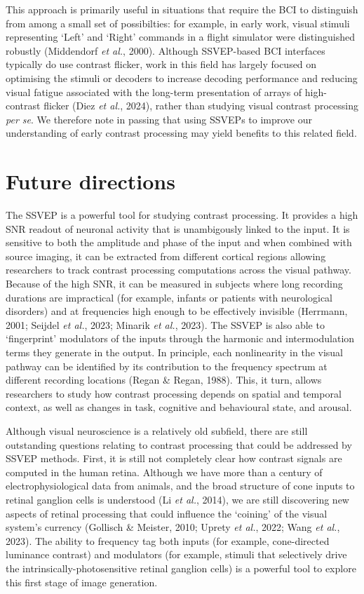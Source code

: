 \documentclass[
  letterpaper,
  DIV=11,
  numbers=noendperiod]{scrartcl}
\begin{document}
This approach is primarily useful in situations that require the BCI to
distinguish from among a small set of possibilties: for example, in
early work, visual stimuli representing `Left' and `Right' commands in a
flight simulator were distinguished robustly (Middendorf \emph{et al.},
2000). Although SSVEP-based BCI interfaces typically do use contrast
flicker, work in this field has largely focused on optimising the
stimuli or decoders to increase decoding performance and reducing visual
fatigue associated with the long-term presentation of arrays of
high-contrast flicker (Diez \emph{et al.}, 2024), rather than studying
visual contrast processing \textit{per se}. We therefore note in passing
that using SSVEPs to improve our understanding of early contrast
processing may yield benefits to this related field.

\section{Future directions}\label{future-directions}

The SSVEP is a powerful tool for studying contrast processing. It
provides a high SNR readout of neuronal activity that is unambigously
linked to the input. It is sensitive to both the amplitude and phase of
the input and when combined with source imaging, it can be extracted
from different cortical regions allowing researchers to track contrast
processing computations across the visual pathway. Because of the high
SNR, it can be measured in subjects where long recording durations are
impractical (for example, infants or patients with neurological
disorders) and at frequencies high enough to be effectively invisible
(Herrmann, 2001; Seijdel \emph{et al.}, 2023; Minarik \emph{et al.},
2023). The SSVEP is also able to `fingerprint' modulators of the inputs
through the harmonic and intermodulation terms they generate in the
output. In principle, each nonlinearity in the visual pathway can be
identified by its contribution to the frequency spectrum at different
recording locations (Regan \& Regan, 1988). This, it turn, allows
researchers to study how contrast processing depends on spatial and
temporal context, as well as changes in task, cognitive and behavioural
state, and arousal.

Although visual neuroscience is a relatively old subfield, there are
still outstanding questions relating to contrast processing that could
be addressed by SSVEP methods. First, it is still not completely clear
how contrast signals are computed in the human retina. Although we have
more than a century of electrophysiological data from animals, and the
broad structure of cone inputs to retinal ganglion cells is understood
(Li \emph{et al.}, 2014), we are still discovering new aspects of
retinal processing that could influence the `coining' of the visual
system's currency (Gollisch \& Meister, 2010; Uprety \emph{et al.},
2022; Wang \emph{et al.}, 2023). The ability to frequency tag both
inputs (for example, cone-directed luminance contrast) and modulators
(for example, stimuli that selectively drive the
intrinsically-photosensitive retinal ganglion cells) is a powerful tool
to explore this first stage of image generation.
\end{document}
